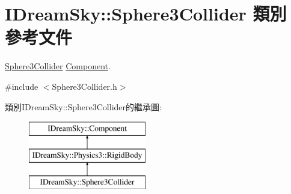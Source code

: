 \hypertarget{class_i_dream_sky_1_1_sphere3_collider}{}\section{I\+Dream\+Sky\+:\+:Sphere3\+Collider 類別 參考文件}
\label{class_i_dream_sky_1_1_sphere3_collider}


\hyperlink{class_i_dream_sky_1_1_sphere3_collider}{Sphere3\+Collider} \hyperlink{class_i_dream_sky_1_1_component}{Component}.  




{\ttfamily \#include $<$Sphere3\+Collider.\+h$>$}

類別\+I\+Dream\+Sky\+:\+:Sphere3\+Collider的繼承圖\+:\begin{figure}[H]
\begin{center}
\leavevmode
\includegraphics[height=3.000000cm]{class_i_dream_sky_1_1_sphere3_collider}
\end{center}
\end{figure}
